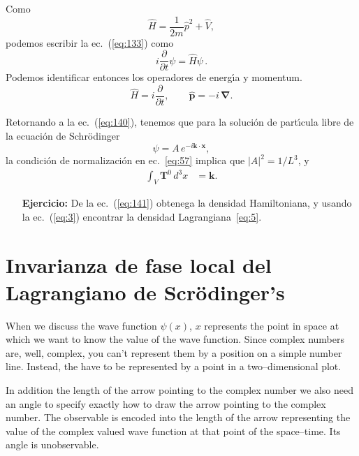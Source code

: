 Como
\begin{equation}
  \widehat H=\frac{1}{2m}\hat p^2+\widehat V,
\end{equation}
podemos escribir la ec.~(\ref{eq:133}) como
\begin{equation}
  i\frac{\partial}{\partial t}\psi=\widehat H \psi\,.
\end{equation}
Podemos identificar entonces los operadores de energ\'\i a y momentum.
\begin{equation}
  \label{eq:151}
  \widehat H=i\frac{\partial}{\partial t},\qquad \hat{\mathbf{p}}=-i\,\boldsymbol{\nabla}.
\end{equation}

Retornando a la ec.~(\ref{eq:140}), tenemos que para la soluci\'on de part\'\i cula libre de la ecuaci\'on de Schr\"odinger 
\begin{equation}
  \psi=A\,e^{-i\mathbf{k}\cdot\mathbf{x}},
\end{equation}
la condici\'on de normalizaci\'on en ec.~\eqref{eq:57} implica que $|A|^2=1/L^3$, y
\begin{align}
  \int_V \mathbf{T}^0\, d^3x&=\mathbf{k}.
\end{align}

\begin{itemize}
\item[\textbf{Ejercicio:}]  De la ec.~(\ref{eq:141}) obtenega la densidad Hamiltoniana, y usando la ec.~(\ref{eq:3}) encontrar la densidad Lagrangiana~\eqref{eq:5}.
\end{itemize}



\section{Invarianza de fase local del Lagrangiano de  Scrödinger's}


When we discuss the wave function $\psi(x)$, $x$ represents the point in space at which we want to know the value of the wave function. Since complex numbers are, well, complex, you can't represent them by a position on a simple number line. Instead, the have to be represented by a point in a two--dimensional plot. 

In addition the length of the arrow pointing to the complex number we also need an angle to specify exactly how to draw the arrow pointing to the complex number. The observable is encoded into the length of the arrow representing the value of the complex valued wave function at that point of the space--time. Its angle is unobservable.

